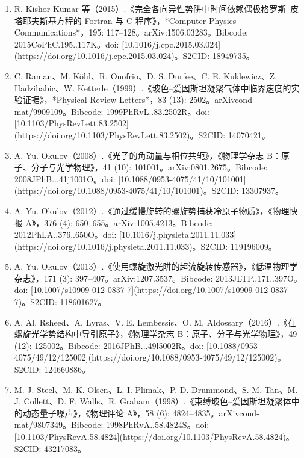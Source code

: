 \begin{enumerate}
\item R. Kishor Kumar 等（2015）.《完全各向异性势阱中时间依赖偶极格罗斯–皮塔耶夫斯基方程的 Fortran 与 C 程序》，*Computer Physics Communications*，195: 117–128。arXiv:1506.03283。Bibcode: 2015CoPhC.195..117K。doi: [10.1016/j.cpc.2015.03.024](https://doi.org/10.1016/j.cpc.2015.03.024)。S2CID: 18949735。
\item C. Raman、M. Köhl、R. Onofrio、D. S. Durfee、C. E. Kuklewicz、Z. Hadzibabic、W. Ketterle（1999）.《玻色–爱因斯坦凝聚气体中临界速度的实验证据》，*Physical Review Letters*，83 (13): 2502。arXiv\:cond-mat/9909109。Bibcode: 1999PhRvL..83.2502R。doi: [10.1103/PhysRevLett.83.2502](https://doi.org/10.1103/PhysRevLett.83.2502)。S2CID: 14070421。
\item A. Yu. Okulov（2008）.《光子的角动量与相位共轭》，《物理学杂志 B：原子、分子与光学物理》，41 (10): 101001。arXiv:0801.2675。Bibcode: 2008JPhB...41j1001O。doi: [10.1088/0953-4075/41/10/101001](https://doi.org/10.1088/0953-4075/41/10/101001)。S2CID: 13307937。
\item A. Yu. Okulov（2012）.《通过缓慢旋转的螺旋势捕获冷原子物质》，《物理快报 A》，376 (4): 650–655。arXiv:1005.4213。Bibcode: 2012PhLA..376..650O。doi: [10.1016/j.physleta.2011.11.033](https://doi.org/10.1016/j.physleta.2011.11.033)。S2CID: 119196009。
\item A. Yu. Okulov（2013）.《使用螺旋激光阱的超流旋转传感器》，《低温物理学杂志》，171 (3): 397–407。arXiv:1207.3537。Bibcode: 2013JLTP..171..397O。doi: [10.1007/s10909-012-0837-7](https://doi.org/10.1007/s10909-012-0837-7)。S2CID: 118601627。
\item A. Al. Rsheed、A. Lyras、V. E. Lembessis、O. M. Aldossary（2016）.《在螺旋光学势结构中导引原子》，《物理学杂志 B：原子、分子与光学物理》，49 (12): 125002。Bibcode: 2016JPhB...49l5002R。doi: [10.1088/0953-4075/49/12/125002](https://doi.org/10.1088/0953-4075/49/12/125002)。S2CID: 124660886。
\item M. J. Steel、M. K. Olsen、L. I. Plimak、P. D. Drummond、S. M. Tan、M. J. Collett、D. F. Walls、R. Graham（1998）.《束缚玻色–爱因斯坦凝聚体中的动态量子噪声》，《物理评论 A》，58 (6): 4824–4835。arXiv\:cond-mat/9807349。Bibcode: 1998PhRvA..58.4824S。doi: [10.1103/PhysRevA.58.4824](https://doi.org/10.1103/PhysRevA.58.4824)。S2CID: 43217083。

\end{enumerate}